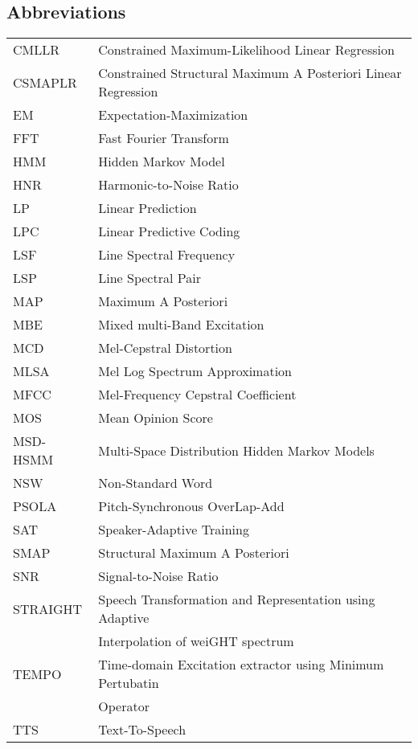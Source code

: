 \documentclass[english,12pt,a4paper,pdftex]{article}
\begin{document}
\subsection*{Abbreviations}
\begin{tabular}{l l}
	CMLLR		& Constrained Maximum-Likelihood Linear Regression\\
	CSMAPLR		& Constrained Structural Maximum A Posteriori Linear Regression\\
	EM 			& Expectation-Maximization\\
	FFT 		& Fast Fourier Transform\\
	HMM			& Hidden Markov Model\\
	HNR			& Harmonic-to-Noise Ratio\\
	LP			& Linear Prediction\\
	LPC 		& Linear Predictive Coding\\
	LSF			& Line Spectral Frequency\\
	LSP			& Line Spectral Pair\\
	MAP			& Maximum A Posteriori\\
	MBE			& Mixed multi-Band Excitation\\
	MCD 		& Mel-Cepstral Distortion\\
	MLSA		& Mel Log Spectrum Approximation\\
	MFCC		& Mel-Frequency Cepstral Coefficient\\
	MOS			& Mean Opinion Score\\
	MSD-HSMM	& Multi-Space Distribution Hidden Markov Models\\
	NSW			& Non-Standard Word\\
	PSOLA		& Pitch-Synchronous OverLap-Add\\
	SAT			& Speaker-Adaptive Training\\
	SMAP 		& Structural Maximum A Posteriori\\
	SNR 		& Signal-to-Noise Ratio\\
	STRAIGHT	& Speech Transformation and Representation using Adaptive \\
				& Interpolation of weiGHT spectrum\\
	TEMPO		& Time-domain Excitation extractor using Minimum Pertubatin\\
				& Operator\\
	TTS			& Text-To-Speech
\end{tabular}
\cleardoublepage
\storeinipagenumber
{}
\setcounter{page}{1}
\end{document}
